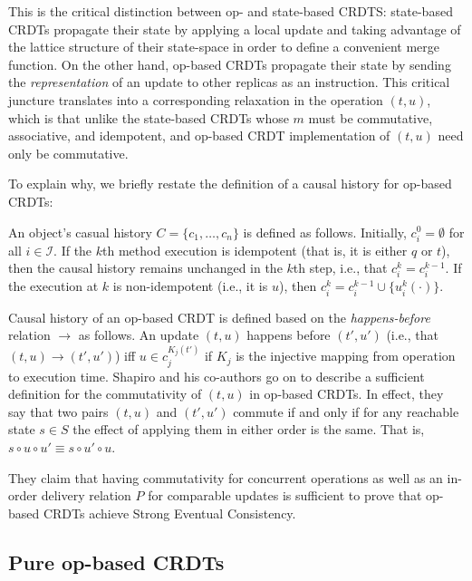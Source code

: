 This is the critical distinction between op- and state-based CRDTS:
state-based CRDTs propagate their state by applying a local update and taking
advantage of the lattice structure of their state-space in order to define a
convenient merge function. On the other hand, op-based CRDTs propagate their
state by sending the \textit{representation} of an update to other replicas as
an instruction. This critical juncture translates into a corresponding
relaxation in the operation $(t, u)$, which is that unlike the state-based CRDTs
whose $m$ must be commutative, associative, and idempotent, and op-based CRDT
implementation of $(t, u)$ need only be commutative.

To explain why, we briefly restate the definition of a causal history for
op-based CRDTs:

\begin{definition}
An object's casual history $C = \{ c_1, \ldots, c_n \}$ is defined as follows.
Initially, $c_i^0 = \emptyset$ for all $i \in \mathcal{I}$. If the $k$th method
execution is idempotent (that is, it is either $q$ or $t$), then the causal
history remains unchanged in the $k$th step, i.e., that $c_i^k = c_i^{k-1}$. If
the execution at $k$ is non-idempotent (i.e., it is $u$), then $c_i^{k} =
c_i^{k-1} \cup \{ u_i^k(\cdot) \}$.
\end{definition}

Causal history of an op-based CRDT is defined based on the
\textit{happens-before} relation $\to$ as follows. An update $(t,u)$ happens
before $(t',u')$ (i.e., that $(t, u) \to (t', u')$) iff $u \in c_{j}^{K_j(t')}$
if $K_j$ is the injective mapping from operation to execution time. Shapiro and
his co-authors go on to describe a sufficient definition for the commutativity
of $(t,u)$ in op-based CRDTs. In effect, they say that two pairs $(t,u)$ and
$(t',u')$ commute if and only if for any reachable state $s \in S$ the effect of
applying them in either order is the same. That is, $s \circ u \circ u' \equiv s
\circ u' \circ u$.

They claim that having commutativity for concurrent operations as well as an
in-order delivery relation $P$ for comparable updates is sufficient to prove
that op-based CRDTs achieve Strong Eventual Consistency.

\subsection{Pure op-based CRDTs}


